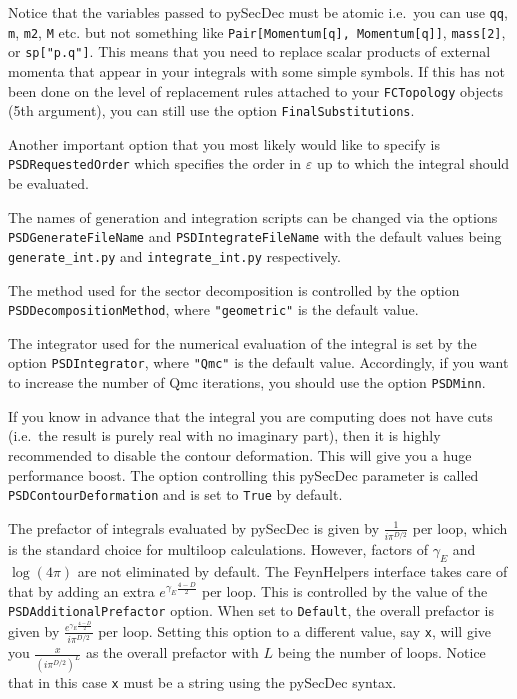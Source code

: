 \documentclass[../FeynHelpersManual.tex]{subfiles}
\begin{document}
Notice that the variables passed to pySecDec must be atomic i.e.~you can
use \texttt{qq}, \texttt{m}, \texttt{m2}, \texttt{M} etc. but not
something like
\texttt{Pair[\allowbreak{}Momentum[\allowbreak{}q],\ \allowbreak{}Momentum[\allowbreak{}q]]},
\texttt{mass[\allowbreak{}2]}, or \texttt{sp[\allowbreak{}"p.q"]}. This
means that you need to replace scalar products of external momenta that
appear in your integrals with some simple symbols. If this has not been
done on the level of replacement rules attached to your
\texttt{FCTopology} objects (5th argument), you can still use the option
\texttt{FinalSubstitutions}.

Another important option that you most likely would like to specify is
\texttt{PSDRequestedOrder} which specifies the order in \(\varepsilon\)
up to which the integral should be evaluated.

The names of generation and integration scripts can be changed via the
options \texttt{PSDGenerateFileName} and \texttt{PSDIntegrateFileName}
with the default values being \texttt{generate_int.py} and
\texttt{integrate_int.py} respectively.

The method used for the sector decomposition is controlled by the option
\texttt{PSDDecompositionMethod}, where \texttt{"geometric"} is the
default value.

The integrator used for the numerical evaluation of the integral is set
by the option \texttt{PSDIntegrator}, where \texttt{"Qmc"} is the
default value. Accordingly, if you want to increase the number of Qmc
iterations, you should use the option \texttt{PSDMinn}.

If you know in advance that the integral you are computing does not have
cuts (i.e.~the result is purely real with no imaginary part), then it is
highly recommended to disable the contour deformation. This will give
you a huge performance boost. The option controlling this pySecDec
parameter is called \texttt{PSDContourDeformation} and is set to
\texttt{True} by default.

The prefactor of integrals evaluated by pySecDec is given by
\(\frac{1}{i \pi^{D/2}}\) per loop, which is the standard choice for
multiloop calculations. However, factors of \(\gamma_E\) and
\(\log(4\pi)\) are not eliminated by default. The FeynHelpers interface
takes care of that by adding an extra \(e^{\gamma_E \frac{4-D}{2}}\) per
loop. This is controlled by the value of the
\texttt{PSDAdditionalPrefactor} option. When set to \texttt{Default},
the overall prefactor is given by
\(\frac{e^{\gamma_E \frac{4-D}{2}}}{i \pi^{D/2}}\) per loop. Setting
this option to a different value, say \texttt{x}, will give you
\(\frac{x}{(i \pi^{D/2})^L}\) as the overall prefactor with \(L\) being
the number of loops. Notice that in this case \texttt{x} must be a
string using the pySecDec syntax.
\end{document}
